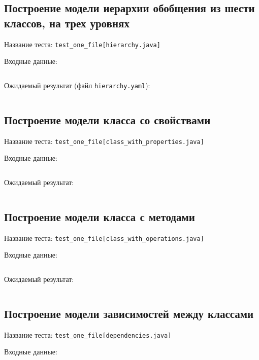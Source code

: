 \inputminted{yaml}{../src/test/data/model/implements.yaml}

\subsection*{Построение модели иерархии обобщения из шести классов, на трех уровнях}

Название теста: \verb;test_one_file[hierarchy.java];

Входные данные:

\inputminted{java}{../src/test/data/src/hierarchy.java}

Ожидаемый результат (файл \verb;hierarchy.yaml;):

\inputminted{yaml}{../src/test/data/model/hierarchy.yaml}

\subsection*{Построение модели класса со свойствами}

Название теста: \verb;test_one_file[class_with_properties.java];

Входные данные:

\inputminted{java}{../src/test/data/src/class_with_properties.java}

Ожидаемый результат:

\inputminted{yaml}{../src/test/data/model/class_with_properties.yaml}

\subsection*{Построение модели класса с методами}

Название теста: \verb;test_one_file[class_with_operations.java];

Входные данные:

\inputminted{java}{../src/test/data/src/class_with_operations.java}

Ожидаемый результат:

\inputminted{yaml}{../src/test/data/model/class_with_operations.yaml}

\subsection*{Построение модели зависимостей между классами}

Название теста: \verb;test_one_file[dependencies.java];

Входные данные:

